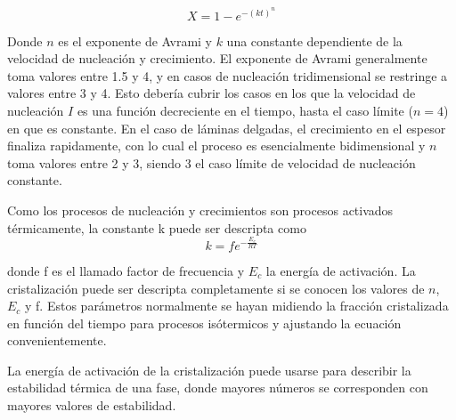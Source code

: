 \documentclass{article}
\theoremstyle{definition}
\theoremstyle{remark}
\begin{document}
\begin{equation}
	X = 1 - e^{-(kt)^n}
\end{equation}

Donde $n$ es el exponente de Avrami y $k$ una constante dependiente de la velocidad de nucleación y crecimiento.
	El exponente de Avrami generalmente toma valores entre 1.5 y 4, y en casos de nucleación tridimensional se restringe a valores entre 3 y 4. Esto debería cubrir los casos en los que la velocidad de nucleación $I$ es una función decreciente en el tiempo, hasta el caso límite ($n = 4$) en que es constante. En el caso de láminas delgadas, el crecimiento en el espesor finaliza rapidamente, con lo cual el proceso es esencialmente bidimensional y $n$ toma valores entre 2 y 3, siendo 3 el caso límite de velocidad de nucleación constante. 
	
Como los procesos de nucleación y crecimientos son procesos activados térmicamente, la constante k puede ser descripta como
\begin{equation}
\label{kvalue}
	k=fe^{-\frac{E_c}{RT}}
\end{equation}

donde f es el llamado factor de frecuencia y $E_c$ la energía de activación.
La cristalización puede ser descripta completamente si se conocen los valores de $n$, $E_c$ y f. Estos parámetros normalmente se hayan midiendo la fracción cristalizada en función del tiempo para procesos isótermicos y ajustando la ecuación convenientemente.

La energía de activación de la cristalización puede usarse para describir la estabilidad térmica de una fase, donde mayores números se corresponden con mayores valores de estabilidad.
\end{document}
